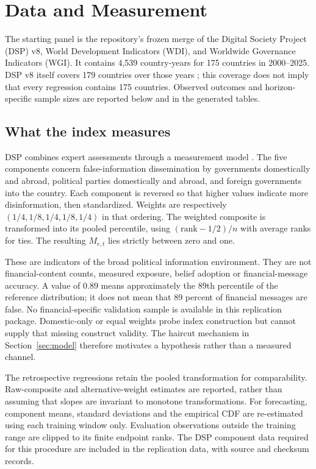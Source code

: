 \section{Data and Measurement}\label{sec:data}

The starting panel is the repository's frozen merge of the Digital Society
Project (DSP) v8, World Development Indicators (WDI), and Worldwide Governance
Indicators (WGI). It contains 4,539 country-years for 175 countries in
2000--2025. DSP v8 itself covers 179 countries over those years
\citep{mechkova2026dsp}; this coverage does not imply that every regression
contains 175 countries. Observed outcomes and horizon-specific sample sizes
are reported below and in the generated tables.

\subsection{What the index measures}\label{subsec:index}
DSP combines expert assessments through a measurement model
\citep{pemstein2018latent}. The five components concern false-information
dissemination by governments domestically and abroad, political parties
domestically and abroad, and foreign governments into the country. Each
component is reversed so that higher values indicate more disinformation,
then standardized. Weights are respectively $(1/4,1/8,1/4,1/8,1/4)$ in that
ordering. The weighted composite is transformed into its pooled percentile,
using $(\mathrm{rank}-1/2)/n$ with average ranks for ties. The resulting
$M_{r,t}$ lies strictly between zero and one.

These are indicators of the broad political information environment. They
are not financial-content counts, measured exposure, belief adoption or
financial-message accuracy. A value of $0.89$ means approximately the 89th
percentile of the reference distribution; it does not mean that 89 percent
of financial messages are false. No financial-specific validation sample is
available in this replication package. Domestic-only or equal weights probe
index construction but cannot supply that missing construct validity.
The haircut mechanism in Section~\ref{sec:model} therefore motivates a
hypothesis rather than a measured channel.

The retrospective regressions retain the pooled transformation for
comparability. Raw-composite and alternative-weight estimates are reported,
rather than assuming that slopes are invariant to monotone transformations.
For forecasting, component means, standard deviations and the empirical CDF
are re-estimated using each training window only. Evaluation observations
outside the training range are clipped to its finite endpoint ranks. The
DSP component data required for this procedure are included in the
replication data, with source and checksum records.

